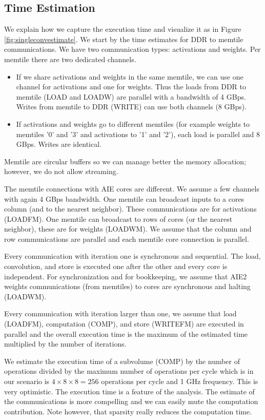 \documentclass[sigconf]{acmart}
\begin{document}
\subsection{Time Estimation}
We explain how we capture the execution time and visualize it as in
Figure \ref{fig:singleconvestimate}. We start by the time estimates
for DDR to memtile communications. We have two communication types:
activations and weights. Per memtile there are two dedicated channels.
\begin{itemize}
 \item If we share activations and weights in the same memtile, we can
   use one channel for activations and one for weights. Thus the loads
   from DDR to memtile (LOAD and LOADW) are parallel with a bandwidth
   of 4 GBps. Writes from memtile to DDR (WRITE) can use both channels
   (8 GBps).

 \item If activations and weights go to different memtiles (for
   example weights to memtiles '0' and '3' and activations to '1' and
   '2'), each load is parallel and 8 GBps. Writes are identical.
\end{itemize}
Memtile are circular buffers so we can manage better the memory
allocation; however, we do not allow streaming.
   
The memtile connections with AIE cores are different. We assume a few
channels with again 4 GBps bandwidth. One memtile can broadcast
inputs to a cores column (and to the nearest neighbor). These
communications are for activations (LOADFM). One memtile can broadcast
to rows of cores (or the nearest neighbor), these are for weights
(LOADWM). We assume that the column and row communications are
parallel and each memtile core connection is parallel.

Every communication with iteration one is synchronous and sequential.
The load, convolution, and store is executed one after the other and
every core is independent.  For synchronization and for bookkeeping,
we assume that AIE2 weights communications (from memtiles) to cores are
synchronous and halting (LOADWM).

Every communication with iteration larger than one, we assume that
load (LOADFM), computation (COMP), and store (WRITEFM) are executed in
parallel and the overall execution time is the maximum of the
estimated time multiplied by the number of iterations.

We estimate the execution time of a subvolume (COMP) by the number of
operations divided by the maximum number of operations per cycle which
is in our scenario is $4\times 8 \times 8 = 256 $ operations per cycle
and 1 GHz frequency. This is very optimistic. The execution time is a
feature of the analysis. The estimate of the communications is more
compelling and we can easily mute the computation contribution. Note
however, that sparsity really reduces the computation time.
\end{document}
